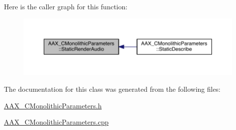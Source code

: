 Here is the caller graph for this function\+:
\nopagebreak
\begin{figure}[H]
\begin{center}
\leavevmode
\includegraphics[width=350pt]{a00026_aff6c9ac549ab88231759a9311b2a6640_icgraph}
\end{center}
\end{figure}




The documentation for this class was generated from the following files\+:\begin{DoxyCompactItemize}
\item 
\hyperlink{a00178}{A\+A\+X\+\_\+\+C\+Monolithic\+Parameters.\+h}\item 
\hyperlink{a00177}{A\+A\+X\+\_\+\+C\+Monolithic\+Parameters.\+cpp}\end{DoxyCompactItemize}
